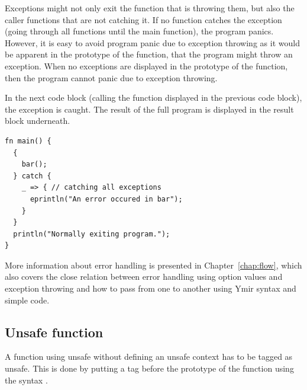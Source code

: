 Exceptions might not only exit the function that is throwing them, but
also the caller functions that are not catching it. If no function catches the
exception (going through all functions until the main function), the program
panics. However, it is easy to avoid program panic due to exception throwing as
it would be apparent in the prototype of the  function, that the
program might throw an exception. When no exceptions are displayed in the
prototype of the  function, then the program cannot panic due to
exception throwing.

In the next code block (calling the  function displayed in the
previous code block), the exception is caught. The result of the full program is
displayed in the result block underneath.


\begin{lstlisting}[style=coloredverbatim]
fn main() {
  {
    bar();
  } catch {
    _ => { // catching all exceptions
      eprintln("An error occured in bar");
    }
  }
  println("Normally exiting program.");
}
\end{lstlisting}


More information about error handling is presented in
Chapter~\ref{chap:flow}, which also covers the close
relation between error handling using option values and exception throwing and
how to pass from one to another using Ymir syntax and simple code.

\subsection{Unsafe function}

A function using unsafe without defining an unsafe context has to be tagged as
unsafe. This is done by putting a tag before the prototype of the function using
the syntax .



